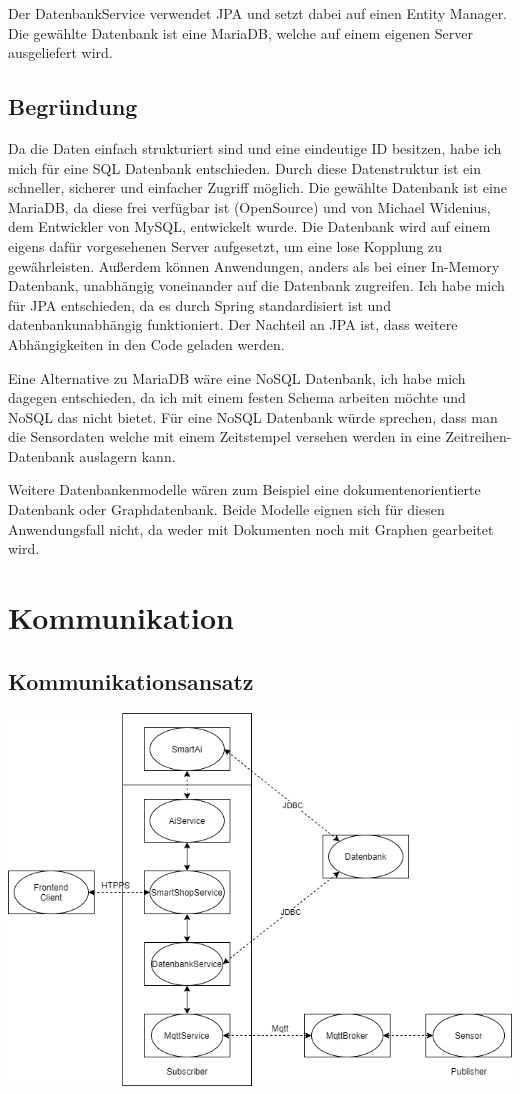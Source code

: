 \documentclass[runningheads]{llncs}
\begin{document}
Der DatenbankService verwendet JPA und setzt dabei auf einen Entity Manager.
Die gewählte Datenbank ist eine MariaDB, welche auf einem eigenen Server ausgeliefert wird.


\subsection{Begründung}
Da die Daten einfach strukturiert sind und eine eindeutige ID besitzen, habe ich mich für eine SQL Datenbank entschieden.
Durch diese Datenstruktur ist ein schneller, sicherer und einfacher Zugriff möglich.
Die gewählte Datenbank ist eine MariaDB, da diese frei verfügbar ist (OpenSource) und von Michael Widenius, dem Entwickler von MySQL, entwickelt wurde.
Die Datenbank wird auf einem eigens dafür vorgesehenen Server aufgesetzt, um eine lose Kopplung zu gewährleisten. Außerdem können Anwendungen, anders als bei einer In-Memory Datenbank, unabhängig voneinander auf die Datenbank zugreifen.
Ich habe mich für JPA entschieden, da es durch Spring standardisiert ist und datenbankunabhängig funktioniert. Der Nachteil an JPA ist, dass weitere Abhängigkeiten in den Code geladen werden.

Eine Alternative zu MariaDB wäre eine NoSQL Datenbank, ich habe mich dagegen entschieden, da ich mit einem festen Schema arbeiten möchte und NoSQL das nicht bietet.
Für eine NoSQL Datenbank würde sprechen, dass man die Sensordaten welche mit einem Zeitstempel versehen werden in eine Zeitreihen-Datenbank auslagern kann.

Weitere Datenbankenmodelle wären zum Beispiel eine dokumentenorientierte Datenbank oder Graphdatenbank. Beide Modelle eignen sich für diesen Anwendungsfall nicht, da weder mit Dokumenten noch mit Graphen gearbeitet wird.
\newpage

\section{Kommunikation}

\subsection{Kommunikationsansatz}
\includegraphics[width=\linewidth]{images/Kommunikation}
\end{document}
